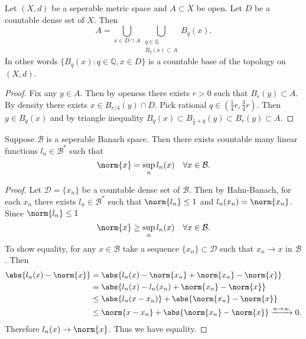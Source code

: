 \documentclass[fontsize=12pt, DIV=10]{scrreprt}
\theoremstyle{remark}
\newcommand{\Q}{\mathbb Q}
\newcommand{\calB}{\mathcal B}
\newcommand{\calD}{\mathcal D}
\begin{document}
\begin{prop}
	Let $(X, d)$ be a seperable metric space and $A \subset X$ be open. Let $D$ be a countable dense set of $X$. Then
	\begin{equation}
		A = \bigcup_{x \in D \cap A} \bigcup_{\substack{q \in \Q \\ B_q(x) \subset A}} B_q(x).
	\end{equation}
	In other words $\{B_q(x) : q \in \Q, x \in D\}$ is a countable base of the topology on $(X, d)$.
\end{prop}

\begin{proof}
	Fix any $y \in A$. Then by openess there exists $r > 0$ such that $B_r(y) \subset A$. By density there exists $x \in B_{r/4}(y) \cap D$. Pick rational $q \in \left(\frac{1}{4}r, \frac{3}{4}r \right)$. Then $y \in B_q(x)$ and by triangle inequality $B_q(x) \subset B_{\frac{r}{4} + q}(y) \subset B_r(y) \subset A$.
\end{proof}

\begin{prop}
	Suppose $\calB$ is a seperable Banach space. Then there exists countable many linear functions $l_n \in \calB^*$ such that
	\begin{equation}
		\norm{x} = \sup_n l_n(x) \quad \forall x \in \calB.
	\end{equation}
\end{prop}
\begin{proof}
	Let $\calD = \{x_n\}$ be a countable dense set of $\calB$. Then by Hahn-Banach, for each $x_n$ there exists $l_n \in \calB^*$ such that $\norm{l_n} \leq 1$ and $l_n(x_n) = \norm{x_n}$. Since $\norm{l_n} \leq 1$
	\begin{equation}
		\norm{x} \geq \sup_n l_n(x) \quad \forall x \in \calB.
	\end{equation}
	To show equality, for any $x \in \calB$ take a sequence $\{x_n\} \subset \calD$ such that $x_n \to x$ in $\calB$. Then
	\begin{align}
		\abs{l_n(x) - \norm{x}}
		&= \abs{l_n(x) - \norm{x_n} + \norm{x_n} - \norm{x}} \\
		&= \abs{l_n(x) - l_n(x_n) + \norm{x_n} - \norm{x}} \\
		&\leq \abs{l_n(x - x_n)} + \abs{\norm{x_n} - \norm{x}} \\
		&\leq \norm{x - x_n} + \abs{\norm{x_n}  - \norm{x}} \xrightarrow{n \to \infty} 0.
	\end{align}
	Therefore $l_n(x) \to \norm{x}$. Thus we have equality.
\end{proof}
\end{document}
